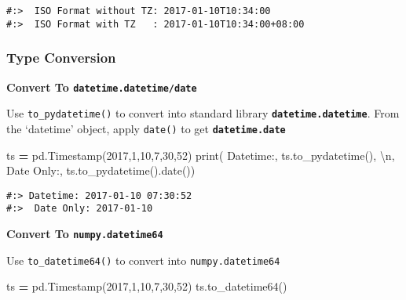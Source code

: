 \documentclass[
]{book}
\newenvironment{Shaded}{\begin{snugshade}}{\end{snugshade}}
\newcommand{\BuiltInTok}[1]{#1}
\newcommand{\CharTok}[1]{\textcolor[rgb]{0.5,0.5,0.5}{#1}}
\newcommand{\DecValTok}[1]{\textcolor[rgb]{0.06,0.06,0.06}{#1}}
\newcommand{\NormalTok}[1]{#1}
\newcommand{\OperatorTok}[1]{\textcolor[rgb]{0.43,0.43,0.43}{\textbf{#1}}}
\newcommand{\StringTok}[1]{\textcolor[rgb]{0.5,0.5,0.5}{#1}}
\begin{document}
\begin{verbatim}
#:>  ISO Format without TZ: 2017-01-10T10:34:00 
#:>  ISO Format with TZ   : 2017-01-10T10:34:00+08:00
\end{verbatim}

\hypertarget{type-conversion}{%
\subsubsection{Type Conversion}\label{type-conversion}}

\textbf{Convert To \texttt{datetime.datetime/date}}

Use \texttt{to\_pydatetime()} to convert into standard library \textbf{\texttt{datetime.datetime}}. From the `datetime' object, apply \texttt{date()} to get \textbf{\texttt{datetime.date}}

\begin{Shaded}
\begin{Highlighting}[]
\NormalTok{ts }\OperatorTok{=}\NormalTok{ pd.Timestamp(}\DecValTok{2017}\NormalTok{,}\DecValTok{1}\NormalTok{,}\DecValTok{10}\NormalTok{,}\DecValTok{7}\NormalTok{,}\DecValTok{30}\NormalTok{,}\DecValTok{52}\NormalTok{)}
\BuiltInTok{print}\NormalTok{(}
  \StringTok{\textquotesingle{}Datetime:\textquotesingle{}}\NormalTok{,  ts.to\_pydatetime(), }\StringTok{\textquotesingle{}}\CharTok{\textbackslash{}n}\StringTok{\textquotesingle{}}\NormalTok{,}
  \StringTok{\textquotesingle{}Date Only:\textquotesingle{}}\NormalTok{, ts.to\_pydatetime().date())}
\end{Highlighting}
\end{Shaded}

\begin{verbatim}
#:> Datetime: 2017-01-10 07:30:52 
#:>  Date Only: 2017-01-10
\end{verbatim}

\textbf{Convert To \texttt{numpy.datetime64}}

Use \texttt{to\_datetime64()} to convert into \texttt{numpy.datetime64}

\begin{Shaded}
\begin{Highlighting}[]
\NormalTok{ts }\OperatorTok{=}\NormalTok{ pd.Timestamp(}\DecValTok{2017}\NormalTok{,}\DecValTok{1}\NormalTok{,}\DecValTok{10}\NormalTok{,}\DecValTok{7}\NormalTok{,}\DecValTok{30}\NormalTok{,}\DecValTok{52}\NormalTok{)}
\NormalTok{ts.to\_datetime64()}
\end{Highlighting}
\end{Shaded}
\end{document}
